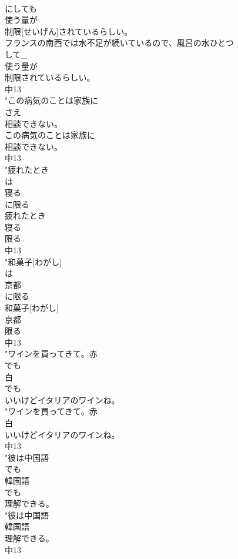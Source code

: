 \documentclass[8pt]{extreport}
\begin{document}
\begin{CJK}{UTF8}{min}
\\	にしても
\\	使う量が
\\	制限[せいげん]されているらしい。
\\	フランスの南西では水不足が続いているので、風呂の水ひとつ
\\	して_
\\	使う量が
\\	制限されているらしい。
\\	中13
\\	"この病気のことは家族に
\\	さえ
\\	相談できない。
\\	この病気のことは家族に
\\	相談できない。
\\	中13
\\	"疲れたとき
\\	は
\\	寝る
\\	に限る
\\	疲れたとき
\\	寝る
\\	限る
\\	中13
\\	"和菓子[わがし]
\\	は
\\	京都
\\	に限る
\\	和菓子[わがし]
\\	京都
\\	限る
\\	中13
\\	"ワインを買ってきて。赤
\\	でも
\\	白
\\	でも
\\	いいけどイタリアのワインね。
\\	"ワインを買ってきて。赤
\\	白
\\	いいけどイタリアのワインね。
\\	中13
\\	"彼は中国語
\\	でも
\\	韓国語
\\	でも
\\	理解できる。
\\	"彼は中国語
\\	韓国語
\\	理解できる。
\\	中13

\end{CJK}
\end{document}
